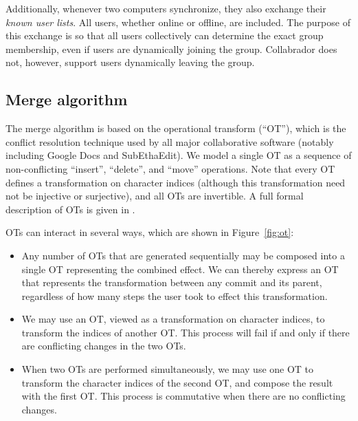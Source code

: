 \documentclass[11pt,titlepage]{article}
\begin{document}
Additionally, whenever two computers synchronize, they also exchange
their \emph{known user lists}. All users, whether online or offline,
are included. The purpose of this exchange is so that all users
collectively can determine the exact group membership, even if users
are dynamically joining the group. Collabrador does not, however,
support users dynamically leaving the group.

\subsection{Merge algorithm}
\label{sec:merge}

The merge algorithm is based on the operational transform (``OT''),
which is the conflict resolution technique used by all major
collaborative software (notably including Google Docs and
SubEthaEdit).  We model a single OT as a sequence of non-conflicting
``insert'', ``delete'', and ``move'' operations.  Note that every OT
defines a transformation on character indices (although this
transformation need not be injective or surjective), and all OTs are
invertible.  A full formal description of OTs is given in \cite{wave}.

OTs can interact in several ways, which are shown in
Figure~\ref{fig:ot}:
\begin{itemize}
\item Any number of OTs that are generated sequentially may be
  composed into a single OT representing the combined effect.  We can
  thereby express an OT that represents the transformation between any
  commit and its parent, regardless of how many steps the user took to
  effect this transformation.
\item We may use an OT, viewed as a transformation on character
  indices, to transform the indices of another OT.  This process will
  fail if and only if there are conflicting changes in the two OTs.
\item When two OTs are performed simultaneously, we may use one OT to
  transform the character indices of the second OT, and compose the
  result with the first OT.  This process is commutative when there
  are no conflicting changes.
\end{itemize}
\end{document}
